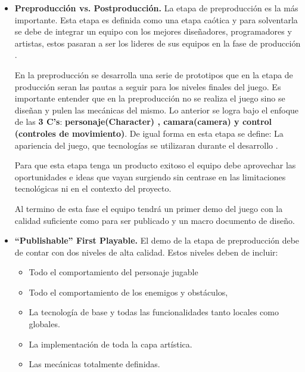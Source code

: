  \begin{itemize}
 	\item \textbf{Preproducción vs. Postproducción.} 
La etapa de preproducción es la más importante. Esta etapa es definida como una 
etapa caótica y para solventarla se debe de integrar un equipo con los mejores 
diseñadores, programadores y artistas, estos pasaran a ser los lideres de sus 
equipos en la fase de producción \cite{MetodoCerny}.
 \\
 \par
En la preproducción se desarrolla una serie de prototipos que en la etapa de 
producción seran las pautas a seguir para los niveles finales del juego. Es 
importante entender que en la preproducción no se realiza el juego sino se 
diseñan y pulen las mecánicas del mismo. Lo anterior se logra bajo el enfoque 
de las \textbf{3 C’s}: \textbf{personaje(Character) , camara(camera) y control
(controles de movimiento)}. De igual forma en esta etapa se define: La apariencia 
del juego, que tecnologías se utilizaran durante el desarrollo \cite{MetodoCerny}.
\\
\par
Para que esta etapa tenga un producto exitoso el equipo debe aprovechar las 
oportunidades e ideas que vayan surgiendo sin centrase en las limitaciones 
tecnológicas ni en el contexto del proyecto. 
\\
\par
Al termino de esta fase el equipo tendrá un primer demo del juego con la calidad 
suficiente como para ser publicado y un macro documento de diseño. 
\\
\par
	\item \textbf{“Publishable” First Playable.}
El demo de la etapa de preproducción debe de contar con dos niveles de alta calidad. 
Estos niveles deben de incluir: 
	\begin{itemize}
	\item Todo el comportamiento del personaje jugable
	\item Todo el comportamiento de los enemigos y obstáculos,
	\item La tecnología de base y todas las funcionalidades tanto locales como globales.
	\item La implementación de toda la capa artística.
	\item Las mecánicas totalmente definidas.
	\end{itemize}
	


\end{itemize}
